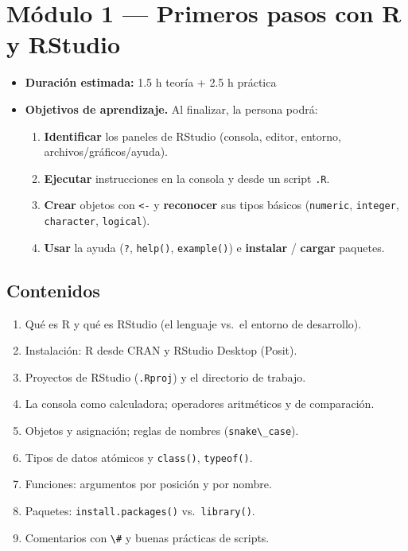 \chapter{Módulo 1 --- Primeros pasos con R y RStudio}

\begin{itemize}
\tightlist
\item
  \textbf{Duración estimada:} 1.5 h teoría + 2.5 h práctica
\item
  \textbf{Objetivos de aprendizaje.} Al finalizar, la persona podrá:

  \begin{enumerate}
  \def\labelenumi{\arabic{enumi}.}
  \tightlist
  \item
    \textbf{Identificar} los paneles de RStudio (consola, editor,
    entorno, archivos/gráficos/ayuda).
  \item
    \textbf{Ejecutar} instrucciones en la consola y desde un script
    \passthrough{\lstinline!.R!}.
  \item
    \textbf{Crear} objetos con \passthrough{\lstinline!<-!} y
    \textbf{reconocer} sus tipos básicos
    (\passthrough{\lstinline!numeric!},
    \passthrough{\lstinline!integer!},
    \passthrough{\lstinline!character!},
    \passthrough{\lstinline!logical!}).
  \item
    \textbf{Usar} la ayuda (\passthrough{\lstinline!?!},
    \passthrough{\lstinline!help()!},
    \passthrough{\lstinline!example()!}) e \textbf{instalar} /
    \textbf{cargar} paquetes.
  \end{enumerate}
\end{itemize}

\section{Contenidos}

\begin{enumerate}
\def\labelenumi{\arabic{enumi}.}
\tightlist
\item
  Qué es R y qué es RStudio (el lenguaje vs.~el entorno de desarrollo).
\item
  Instalación: R desde CRAN y RStudio Desktop (Posit).
\item
  Proyectos de RStudio (\passthrough{\lstinline!.Rproj!}) y el
  directorio de trabajo.
\item
  La consola como calculadora; operadores aritméticos y de comparación.
\item
  Objetos y asignación; reglas de nombres
  (\passthrough{\lstinline!snake\_case!}).
\item
  Tipos de datos atómicos y \passthrough{\lstinline!class()!},
  \passthrough{\lstinline!typeof()!}.
\item
  Funciones: argumentos por posición y por nombre.
\item
  Paquetes: \passthrough{\lstinline!install.packages()!}
  vs.~\passthrough{\lstinline!library()!}.
\item
  Comentarios con \passthrough{\lstinline!\#!} y buenas prácticas de
  scripts.
\end{enumerate}

